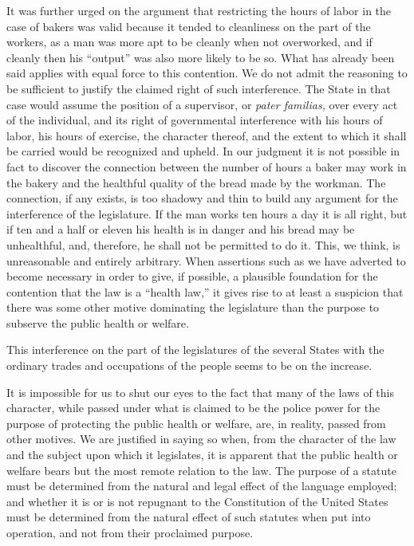 \documentclass[
  letterpaper,
  11pt,
  DIV=9,
  openright]{scrbook}
\begin{document}
It was further urged on the argument that restricting the hours of labor
in the case of bakers was valid because it tended to cleanliness on the
part of the workers, as a man was more apt to be cleanly when not
overworked, and if cleanly then his ``output'' was also more likely to
be so. What has already been said applies with equal force to this
contention. We do not admit the reasoning to be sufficient to justify
the claimed right of such interference. The State in that case would
assume the position of a supervisor, or \emph{pater familias,} over
every act of the individual, and its right of governmental interference
with his hours of labor, his hours of exercise, the character thereof,
and the extent to which it shall be carried would be recognized and
upheld. In our judgment it is not possible in fact to discover the
connection between the number of hours a baker may work in the bakery
and the healthful quality of the bread made by the workman. The
connection, if any exists, is too shadowy and thin to build any argument
for the interference of the legislature. If the man works ten hours a
day it is all right, but if ten and a half or eleven his health is in
danger and his bread may be unhealthful, and, therefore, he shall not be
permitted to do it. This, we think, is unreasonable and entirely
arbitrary. When assertions such as we have adverted to become necessary
in order to give, if possible, a plausible foundation for the contention
that the law is a ``health law,'' it gives rise to at least a suspicion
that there was some other motive dominating the legislature than the
purpose to subserve the public health or welfare.

This interference on the part of the legislatures of the several States
with the ordinary trades and occupations of the people seems to be on
the increase.

It is impossible for us to shut our eyes to the fact that many of the
laws of this character, while passed under what is claimed to be the
police power for the purpose of protecting the public health or welfare,
are, in reality, passed from other motives. We are justified in saying
so when, from the character of the law and the subject upon which it
legislates, it is apparent that the public health or welfare bears but
the most remote relation to the law. The purpose of a statute must be
determined from the natural and legal effect of the language employed;
and whether it is or is not repugnant to the Constitution of the United
States must be determined from the natural effect of such statutes when
put into operation, and not from their proclaimed purpose.
\end{document}
